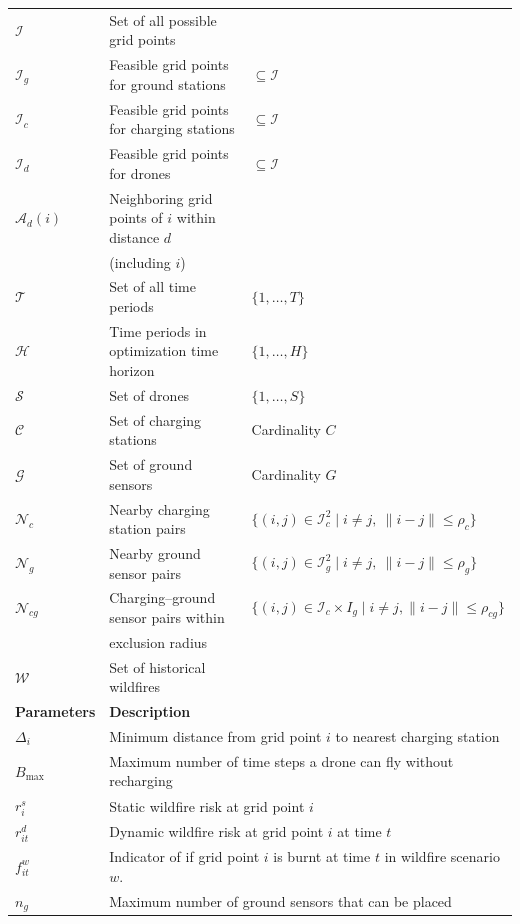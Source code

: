 \documentclass{article}
\newcommand{\set}[1]{\mathcal{#1}}
\newcommand{\norm}[1]{\big\| #1\big\| }
\begin{document}
\begin{longtable}{lll}
$\set I$ & Set of all possible grid points & \\
$\set I_g$ & Feasible grid points for ground stations & $\subseteq \set I$ \\
$\set I_c$ & Feasible grid points for charging stations & $\subseteq \set I$ \\
$\set I_d$ & Feasible grid points for drones & $\subseteq \set I$ \\
$\set A_d(i)$ & Neighboring grid points of $i$ within distance $d$ \\
& (including $i$) & \\
$\set T$ & Set of all time periods & $\{1, \ldots, T\}$ \\
$\set H$ & Time periods in optimization time horizon & $\{1, \ldots, H\}$ \\
$\set S$ & Set of drones & $\{1, \ldots, S\}$ \\
$\set C$ & Set of charging stations & Cardinality $C$ \\
$\set G$ & Set of ground sensors & Cardinality $G$ \\
$\set N_{c}$ & Nearby charging station pairs & $\{(i,j) \in \set I_c^2 \mid i \neq j, \ \norm{i-j} \leq \rho_c\}$ \\
$\set N_{g}$ & Nearby ground sensor pairs & $\{(i,j) \in \set I_g^2 \mid i \neq j, \ \norm{i-j} \leq \rho_g\}$ \\
$\set N_{cg}$ & Charging–ground sensor pairs within & $\{(i,j) \in \set I_c \times I_g \mid i \neq j, \norm{i-j} \leq \rho_{cg}\}$ \\
& exclusion radius \\
$\set W$ & Set of historical wildfires \\
\midrule
\textbf{Parameters} & \multicolumn{2}{l}{\textbf{Description}} \\
\midrule
$\Delta_i$ & \multicolumn{2}{l}{Minimum distance from grid point $i$ to nearest charging station} \\
$B_{\text{max}}$ & \multicolumn{2}{l}{Maximum number of time steps a drone can fly without recharging} \\
$r_{i}^s$ & \multicolumn{2}{l}{Static wildfire risk at grid point $i$} \\
$r_{it}^d$ & \multicolumn{2}{l}{Dynamic wildfire risk at grid point $i$ at time $t$} \\
$f_{it}^w$ & \multicolumn{2}{l}{Indicator of if grid point $i$ is burnt at time $t$ in wildfire scenario $w$.} \\
$n_g$ & \multicolumn{2}{l}{Maximum number of ground sensors that can be placed} \\

\end{longtable}
\end{document}
